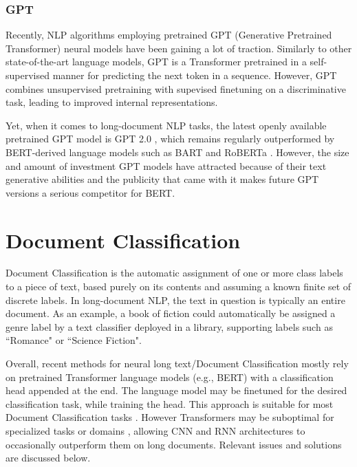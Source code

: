\documentclass[preprint,review,12pt]{elsarticle}
\begin{document}
\subsubsection{GPT}
Recently, NLP algorithms employing pretrained GPT (Generative Pretrained Transformer) \cite{GPT} neural models have been gaining a lot of traction. Similarly to other state-of-the-art language models, GPT is a Transformer pretrained in a self-supervised manner for predicting the next token in a sequence. However, GPT combines unsupervised pretraining with supevised finetuning on a discriminative task, leading to improved internal representations.

Yet, when it comes to long-document NLP tasks, the latest openly available pretrained GPT model is GPT 2.0 \cite{GPT2}, which remains regularly outperformed by BERT-derived language models such as BART \cite{bart} and RoBERTa \cite{roberta} \cite{tanyangxing}. However, the size and amount of investment GPT models have attracted because of their text generative abilities and the publicity that came with it makes future GPT versions a serious competitor for BERT. %

\section{Document Classification}
\label{sec::Classification}
Document Classification is the automatic assignment of one or more class labels to a piece of text, based purely on its contents and assuming a known finite set of discrete labels. In long-document NLP, the text in question is typically an entire document. As an example, a book of fiction could automatically be assigned a genre label by a text classifier deployed in a library, supporting labels such as ``Romance" or ``Science Fiction".

Overall, recent methods for neural long text/Document Classification mostly rely on pretrained Transformer language models (e.g., BERT) with a classification head appended at the end. The language model may be finetuned for the desired classification task, while training the head. This approach is suitable for most Document Classification tasks \cite{qian} \cite{ion} \cite{ion2} \cite{mcbert} \cite{ammar} \cite{so}. However Transformers may be suboptimal for specialized tasks or domains \cite{junhua}, allowing CNN and RNN architectures to occasionally outperform them on long documents. Relevant issues and solutions are discussed below.
\end{document}
